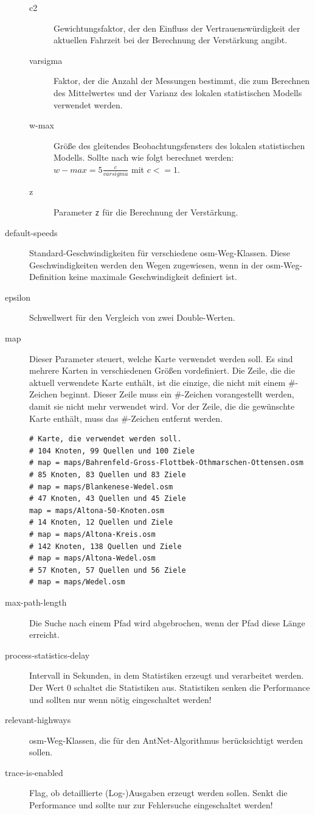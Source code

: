 \begin{description}
\begin{description}
      \item[c2] Gewichtungsfaktor, der den Einfluss der Vertrauenswürdigkeit der aktuellen Fahrzeit bei der Berechnung der Verstärkung angibt.
      \item[varsigma] Faktor, der die Anzahl der Messungen bestimmt, die zum Berechnen des Mittelwertes und der Varianz des lokalen statistischen Modells verwendet werden.
      \item[w-max] Größe des gleitendes Beobachtungsfensters des lokalen statistischen Modells.
        Sollte nach \cite{DorigoStuetzle2004} wie folgt berechnet werden: $w-max = 5 \frac{c}{varsigma}$ mit $c <= 1$.
      \item[z] Parameter \texttt{z} für die Berechnung der Verstärkung.
    \end{description}
  \item[default-speeds] Standard-Geschwindigkeiten für verschiedene \gls{osm}-Weg-Klassen.
    Diese Geschwindigkeiten werden den Wegen zugewiesen, wenn in der \gls{osm}-Weg-Definition keine maximale Geschwindigkeit definiert ist.
  \item[epsilon] Schwellwert für den Vergleich von zwei Double-Werten.
  \item[map] Dieser Parameter steuert, welche Karte verwendet werden soll.
    Es sind mehrere Karten in verschiedenen Größen vordefiniert.
    Die Zeile, die die aktuell verwendete Karte enthält, ist die einzige, die nicht mit einem \#-Zeichen beginnt.
    Dieser Zeile muss ein \#-Zeichen vorangestellt werden, damit sie nicht mehr verwendet wird.
    Vor der Zeile, die die gewünschte Karte enthält, muss das \#-Zeichen entfernt werden.
    \begin{lstlisting}
# Karte, die verwendet werden soll.
# 104 Knoten, 99 Quellen und 100 Ziele
# map = maps/Bahrenfeld-Gross-Flottbek-Othmarschen-Ottensen.osm
# 85 Knoten, 83 Quellen und 83 Ziele
# map = maps/Blankenese-Wedel.osm
# 47 Knoten, 43 Quellen und 45 Ziele
map = maps/Altona-50-Knoten.osm
# 14 Knoten, 12 Quellen und Ziele
# map = maps/Altona-Kreis.osm
# 142 Knoten, 138 Quellen und Ziele
# map = maps/Altona-Wedel.osm
# 57 Knoten, 57 Quellen und 56 Ziele
# map = maps/Wedel.osm
    \end{lstlisting}
  \item[max-path-length] Die Suche nach einem Pfad wird abgebrochen, wenn der Pfad diese Länge erreicht.
  \item[process-statistics-delay] Intervall in Sekunden, in dem Statistiken erzeugt und verarbeitet werden.
    Der Wert 0 schaltet die Statistiken aus.
    Statistiken senken die Performance und sollten nur wenn nötig eingeschaltet werden!
  \item[relevant-highways] \gls{osm}-Weg-Klassen, die für den AntNet-Algorithmus berücksichtigt werden sollen.
  \item[trace-is-enabled] Flag, ob detaillierte (Log-)Ausgaben erzeugt werden sollen.
    Senkt die Performance und sollte nur zur Fehlersuche eingeschaltet werden!
\end{description}

